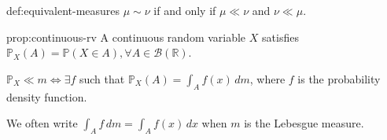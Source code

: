     \begin{definition}{def:equivalent-measures}
    $\mu \sim \nu$ if and only if $\mu \ll \nu$ and $\nu \ll \mu$.
    \end{definition}
    
    \begin{proposition}{prop:continuous-rv}
    A continuous random variable $X$ satisfies $\mathbb{P}_X(A) = \mathbb{P}(X \in A), \forall A \in \mathcal{B}(\mathbb{R})$.
    
    $\mathbb{P}_X \ll m \Leftrightarrow \exists f$ such that $\mathbb{P}_X(A) = \int_A f(x) \, dm$, where $f$ is the probability density function.
    \end{proposition}
    
    \begin{remark}[]{}
    We often write $\int_A f \, dm = \int_A f(x) \, dx$ when $m$ is the Lebesgue measure.
    \end{remark}
